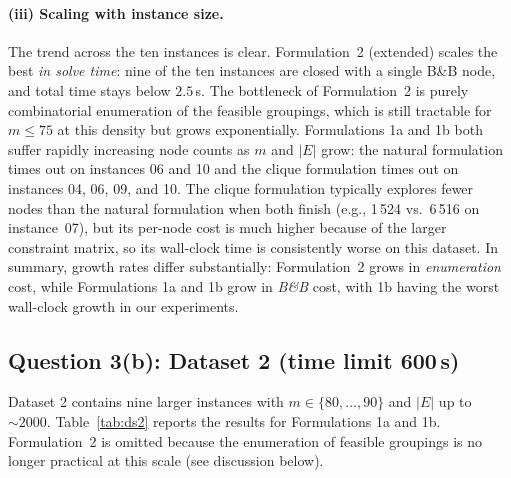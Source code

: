 \documentclass{article}
\begin{document}
\paragraph{(iii) Scaling with instance size.}
The trend across the ten instances is clear. Formulation~2 (extended) scales the best
\emph{in solve time}: nine of the ten instances are closed with a single B\&B node,
and total time stays below $2.5$\,s. The bottleneck of Formulation~2 is purely
combinatorial enumeration of the feasible groupings, which is still tractable for
$m \leq 75$ at this density but grows exponentially. Formulations 1a and 1b both
suffer rapidly increasing node counts as $m$ and $|E|$ grow: the natural formulation
times out on instances 06 and 10 and the clique formulation times out on instances
04, 06, 09, and 10. The clique formulation typically explores fewer nodes than the
natural formulation when both finish (e.g., 1\,524 vs.\ 6\,516 on instance~07), but
its per-node cost is much higher because of the larger constraint matrix, so its
wall-clock time is consistently worse on this dataset. In summary, growth rates differ
substantially: Formulation~2 grows in \emph{enumeration} cost, while Formulations 1a
and 1b grow in \emph{B\&B} cost, with 1b having the worst wall-clock growth in our
experiments.

\subsection{Question 3(b): Dataset 2 (time limit 600\,s)}

Dataset 2 contains nine larger instances with $m \in \{80, \ldots, 90\}$ and
$\lvert E \rvert$ up to $\sim\!2000$. Table~\ref{tab:ds2} reports the results for
Formulations 1a and 1b. Formulation~2 is omitted because the enumeration of feasible
groupings is no longer practical at this scale (see discussion below).
\end{document}
